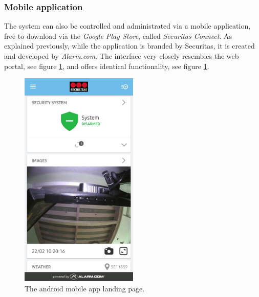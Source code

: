 \subsubsection{Mobile application}
The system can also be controlled and administrated via a mobile application, free to download via the \textit{Google Play Store}, called \textit{Securitas Connect}. As explained previously, while the application is branded by Securitas, it is created and developed by \textit{Alarm.com}. The interface very closely resembles the web portal, see figure \ref{fig:mobile-landing-page}, and offers identical functionality, see figure \ref{fig:mobile-landing-page}.
\begin{figure}[!ht]
    \centering
    \includegraphics[width=0.5\textwidth]{images/mobile-landing-page.jpg}
    \caption{The android mobile app landing page.}
    \label{fig:mobile-landing-page}
\end{figure}

